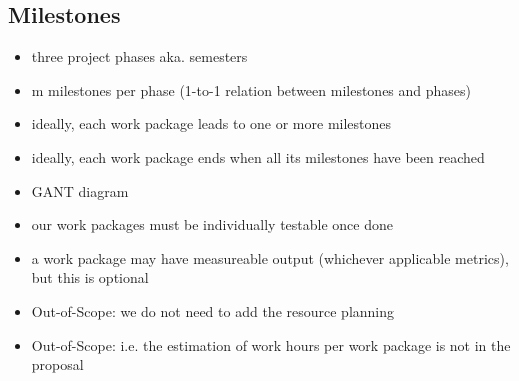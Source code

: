 \subsection{Milestones}

\begin{itemize}
    \item three project phases aka. semesters
    \item m milestones per phase (1-to-1 relation between milestones and phases)
    \item ideally, each work package leads to one or more milestones
    \item ideally, each work package ends when all its milestones have been reached
    \item GANT diagram
    \item our work packages must be individually testable once done
    \item a work package may have measureable output (whichever applicable metrics), but this is optional
    \item Out-of-Scope: we do not need to add the resource planning
    \item Out-of-Scope: i.e. the estimation of work hours per work package is not in the proposal
\end{itemize}

